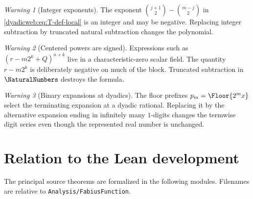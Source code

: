 \documentclass[11pt,oneside]{article}
\theoremstyle{definition}
\theoremstyle{remark}
\newtheorem{warning}[warning]{Warning}
\newcommand{\repo}{\nolinkurl{Analysis/FabiusFunction}}
\begin{document}
\begin{warning}[Integer exponents]
The exponent
$\binom{j+1}{2}-\binom{m-j}{2}$ in \eqref{dyadicweb:eq:T-def-local} is an integer and may be negative.
Replacing integer subtraction by truncated natural subtraction changes the polynomial.
\end{warning}

\begin{warning}[Centered powers are signed]
Expressions such as $(r-m2^k+Q)^{n+k}$ live in a characteristic-zero scalar field.  The
quantity $r-m2^k$ is deliberately negative on much of the block.  Truncated subtraction in
$\NaturalNumbers$ destroys the formula.
\end{warning}

\begin{warning}[Binary expansions at dyadics]
The floor prefixes $p_m=\Floor{2^mx}$ select the terminating expansion at a dyadic
rational.  Replacing it by the alternative expansion ending in infinitely many $1$-digits
changes the termwise digit series even though the represented real number is unchanged.
\end{warning}

\section{Relation to the Lean development}
\label{dyadicweb:sec:formal-map}

The principal source theorems are formalized in the following modules.  Filenames are relative
to \repo.
\end{document}
